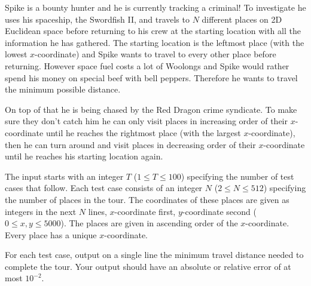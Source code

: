 Spike is a bounty hunter and he is currently tracking a criminal!
To investigate he uses his spaceship, the Swordfish II, and travels to $N$ different places on 2D Euclidean space before returning to his crew at the starting location with all the information he has gathered.
The starting location is the leftmost place (with the lowest $x$-coordinate) and Spike wants to travel to every other place before returning.
However space fuel costs a lot of Woolongs and Spike would rather spend his money on special beef with bell peppers.
Therefore he wants to travel the minimum possible distance.

On top of that he is being chased by the Red Dragon crime syndicate.
To make sure they don't catch him he can only visit places in increasing order of their $x$-coordinate until he reaches the rightmost place (with the largest $x$-coordinate), then he can turn around and visit places in decreasing order
of their $x$-coordinate until he reaches his starting location again.

\begin{Input}
    The input starts with an integer $T$ ($1 \leq T \leq 100$) specifying the number of test cases that follow.
    Each test case consists of an integer $N$ ($2 \leq N \leq 512$) specifying the number of places in the tour.
    The coordinates of these places are given as integers in the next $N$ lines, $x$-coordinate first, $y$-coordinate second ($0 \leq x, y \leq 5000$).
    The places are given in ascending order of the $x$-coordinate.
    Every place has a unique $x$-coordinate.
\end{Input}

\begin{Output}
    For each test case, output on a single line the minimum travel distance needed to complete the tour.
    Your output should have an absolute or relative error of at most $10^{-2}$.
\end{Output}
